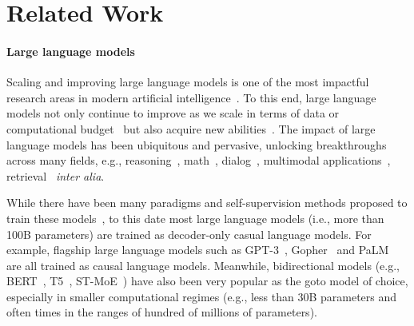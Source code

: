 \documentclass{article}
\begin{document}
\section{Related Work}
\paragraph{Large language models} Scaling and improving large language models is one of the most impactful research areas in modern artificial intelligence~\citep{chowdhery2022palm}. To this end, large language models not only continue to improve as we scale in terms of data or computational budget~\citep{hoffmann2022training,kaplan2020scaling} but also acquire new abilities~\citep{wei2022emergent}. The impact of large language models has been ubiquitous and pervasive, unlocking breakthroughs across many fields, e.g., reasoning~\citep{wei2022chain, wang2022self, zhou2022least, drozdov2022compositional}, math~\citep{lewkowycz2022solving}, dialog~\citep{thoppilan2022lamda}, multimodal applications~\citep{yu2022scaling}, retrieval~\citep{tay2022transformer} \textit{inter alia}.


While there have been many paradigms and self-supervision methods proposed to train these models~\citep{devlin2018bert,clark2020electra,yang2019xlnet,raffel2019exploring}, to this date most large language models (i.e., more than 100B parameters) are trained as decoder-only casual language models. For example, flagship large language models such as GPT-3~\citep{brown2020language}, Gopher~\citep{rae2021scaling} and PaLM~\citep{chowdhery2022palm} are all trained as causal language models. Meanwhile, bidirectional models (e.g., BERT~\citep{devlin2018bert}, T5~\citep{raffel2019exploring}, ST-MoE~\citep{stmoe}) have also been very popular as the goto model of choice, especially in smaller computational regimes (e.g., less than 30B parameters and often times in the ranges of hundred of millions of parameters).
\end{document}
